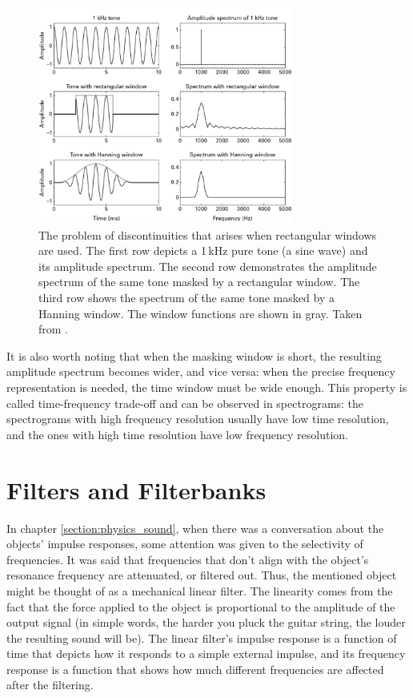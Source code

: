 \begin{figure}[h]
	\centering
	\includegraphics[width=0.75\textwidth]{include/windowing_example}
	\caption[An example of windowing and the problem of discontinuities]{The problem of discontinuities that arises when rectangular windows are used. The first row depicts a 1\,kHz pure tone (a sine wave) and its amplitude spectrum. The second row demonstrates the amplitude spectrum of the same tone masked by a rectangular window. The third row shows the spectrum of the same tone masked by a Hanning window. The window functions are shown in gray. Taken from \cite{Schnupp2011}.}
	\label{img:windowing_example}
\end{figure}

It is also worth noting that when the masking window is short, the resulting amplitude spectrum becomes wider, and vice versa: when the precise frequency representation is needed, the time window must be wide enough. This property is called time-frequency trade-off and can be observed in spectrograms: the spectrograms with high frequency resolution usually have low time resolution, and the ones with high time resolution have low frequency resolution.

\section{Filters and Filterbanks}\label{section:math_filters}

In chapter \ref{section:physics_sound}, when there was a conversation about the objects' impulse responses, some attention was given to the selectivity of frequencies. It was said that frequencies that don't align with the object's resonance frequency are attenuated, or filtered out. Thus, the mentioned object might be thought of as a mechanical linear filter. The linearity comes from the fact that the force applied to the object is proportional to the amplitude of the output signal (in simple words, the harder you pluck the guitar string, the louder the resulting sound will be). The linear filter's impulse response is a function of time that depicts how it responds to a simple external impulse, and its frequency response is a function that shows how much different frequencies are affected after the filtering.\\

